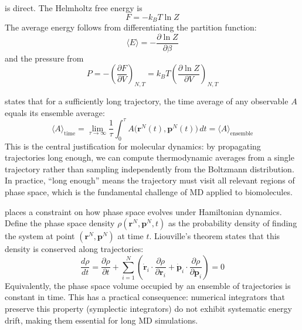  is direct. The Helmholtz free energy is
\begin{equation}
\label{eq:helmholtz}
F = -k_B T \ln Z
\end{equation}
The average energy follows from differentiating the partition function:
\begin{equation}
\label{eq:avg-energy}
\langle E \rangle = -\frac{\partial \ln Z}{\partial \beta}
\end{equation}
and the pressure from
\begin{equation}
\label{eq:pressure}
P = -\left(\frac{\partial F}{\partial V}\right)_{N,T} = k_B T \left(\frac{\partial \ln Z}{\partial V}\right)_{N,T}
\end{equation}

 states that for a sufficiently long trajectory, the time average of any observable $A$ equals its ensemble average:
\begin{equation}
\label{eq:ergodic}
\langle A \rangle_{\text{time}} = \lim_{\tau \to \infty} \frac{1}{\tau} \int_0^\tau A\bigl(\mathbf{r}^N(t), \mathbf{p}^N(t)\bigr) \, dt = \langle A \rangle_{\text{ensemble}}
\end{equation}
This is the central justification for molecular dynamics: by propagating trajectories long enough, we can compute thermodynamic averages from a single trajectory rather than sampling independently from the Boltzmann distribution. In practice, ``long enough'' means the trajectory must visit all relevant regions of phase space, which is the fundamental challenge of MD applied to biomolecules.

 places a constraint on how phase space evolves under Hamiltonian dynamics. Define the phase space density $\rho(\mathbf{r}^N, \mathbf{p}^N, t)$ as the probability density of finding the system at point $(\mathbf{r}^N, \mathbf{p}^N)$ at time $t$. Liouville's theorem states that this density is conserved along trajectories:
\begin{equation}
\label{eq:liouville}
\frac{d\rho}{dt} = \frac{\partial \rho}{\partial t} + \sum_{i=1}^{N} \left( \dot{\mathbf{r}}_i \cdot \frac{\partial \rho}{\partial \mathbf{r}_i} + \dot{\mathbf{p}}_i \cdot \frac{\partial \rho}{\partial \mathbf{p}_i} \right) = 0
\end{equation}
Equivalently, the phase space volume occupied by an ensemble of trajectories is constant in time. This has a practical consequence: numerical integrators that preserve this property (symplectic integrators) do not exhibit systematic energy drift, making them essential for long MD simulations.

